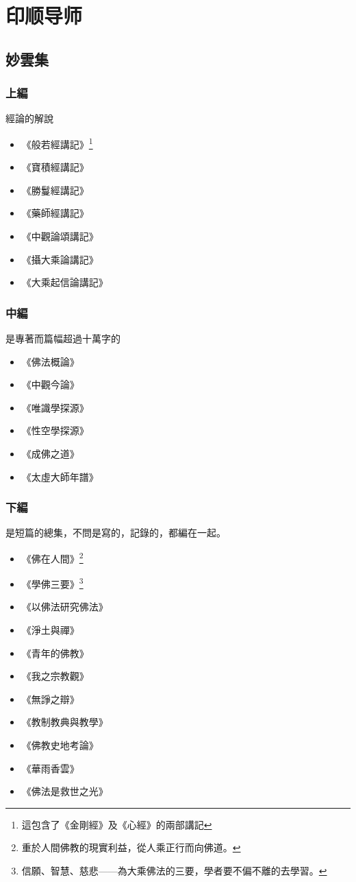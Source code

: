 \section{印顺导师}

\subsection{妙雲集}
\subsubsection{上編}
經論的解說
\begin{itemize}
  \item 《般若經講記》\footnote{這包含了《金剛經》及《心經》的兩部講記}
  \item 《寶積經講記》
  \item 《勝鬘經講記》
  \item 《藥師經講記》
  \item 《中觀論頌講記》
  \item 《攝大乘論講記》
  \item 《大乘起信論講記》
\end{itemize}
\subsubsection{中編}
是專著而篇幅超過十萬字的
\begin{itemize}
  \item 《佛法概論》
  \item 《中觀今論》
  \item 《唯識學探源》
  \item 《性空學探源》
  \item 《成佛之道》
  \item 《太虛大師年譜》
\end{itemize}
\subsubsection{下編}
是短篇的總集，不問是寫的，記錄的，都編在一起。
\begin{itemize}
  \item 《佛在人間》\footnote{重於人間佛教的現實利益，從人乘正行而向佛道。}
  \item 《學佛三要》\footnote{信願、智慧、慈悲——為大乘佛法的三要，學者要不偏不離的去學習。}
  \item 《以佛法研究佛法》
  \item 《淨土與禪》
  \item 《青年的佛教》
  \item 《我之宗教觀》
  \item 《無諍之辯》
  \item 《教制教典與教學》
  \item 《佛教史地考論》
  \item 《華雨香雲》
  \item 《佛法是救世之光》
\end{itemize}
